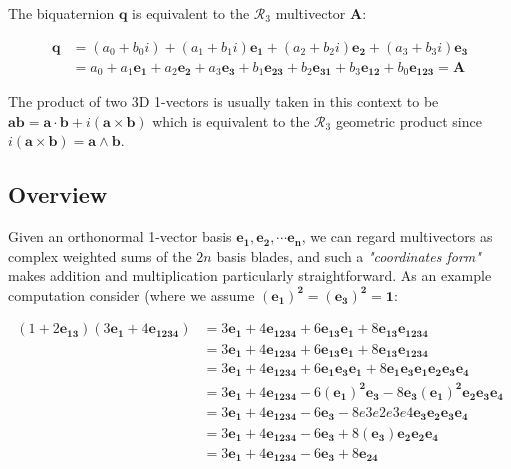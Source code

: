 \documentclass[a4paper]{book}
\numberwithin{equation}{chapter}
\begin{document}
 \vspace{\baselineskip}
 
The biquaternion $\mathbf{q}$ is equivalent to the $\mathcal{R}_3$
multivector $\mathbf{A}$:

\begin{align*}
    \mathbf{q} &= (a_0+b_0 i) + (a_1 + b_1 i)\mathbf{e_1} +
    (a_2+b_2i)\mathbf{e_2} + (a_3 + b_3i)\mathbf{e_3} \\
    &=  a_0 + a_1\mathbf{e_1} + a_2 \mathbf{e_2} + 
    a_3\mathbf{e_3} + b_1 \mathbf{e_{23}} + 
    b_2 \mathbf{e_{31}} + b_3 \mathbf{e_{12}} + b_0 \mathbf{e_{123}} = \mathbf{A}
\end{align*}

The product of two 3D 1-vectors is usually taken in this context 
to be $\mathbf{ab} = \mathbf{a\cdot b} + i(\mathbf{a \times b})$ 
which is equivalent to the $\mathcal{R}_3$ geometric product since 
$i(\mathbf{a \times b})= \mathbf{a \wedge b}$. 

    \subsection{Overview}

Given an orthonormal 1-vector basis $\mathbf{e_1, e_2, \cdots e_n}$, we can regard multivectors as complex weighted sums of the $2n$ basis blades, 
and such a \emph{"coordinates form"} makes addition and multiplication 
particularly straightforward. As an example computation consider (where we assume $\mathbf{(e_1)^2=(e_3)^2=1}$:

\begin{align*}
    (1+2\mathbf{e_{13}})(3\mathbf{e_{1}}+4\mathbf{e_{1234}}) &= 
    3\mathbf{e_{1}}+4\mathbf{e_{1234}} + 6\mathbf{e_{13}}\mathbf{e_{1}}
    + 8\mathbf{e_{13}}\mathbf{e_{1234}}   \\
    &= 3\mathbf{e_{1}}+4\mathbf{e_{1234}} + 6\mathbf{e_{13}}\mathbf{e_{1}} 
    + 8\mathbf{e_{13}}\mathbf{e_{1234}}   \\
    &= 3\mathbf{e_{1}}+4\mathbf{e_{1234}} + 6\mathbf{e_{1}e_3e_1} + 8\mathbf{e_{1}e_3e_1e_2e_3e_4} \\ 
    &= 3\mathbf{e_{1}}+4\mathbf{e_{1234}} - 6\mathbf{(e_{1})^2e_3} - 8\mathbf{e_3(e_1)^2e_2e_3e_4}   \\
    &= 3\mathbf{e_{1}}+4\mathbf{e_{1234}} - 6\mathbf{e_{3}} - 8e3e2e3e4\mathbf{e_3e_2e_3e_4}  \\ 
    &= 3\mathbf{e_{1}}+4\mathbf{e_{1234}} - 6\mathbf{e_{3}} + 8\mathbf{(e_3)e_2e_2e_4} \\  
    &= 3\mathbf{e_{1}}+4\mathbf{e_{1234}} - 6\mathbf{e_{3}} + 8\mathbf{e_{24}}
\end{align*}
 
\end{document}
